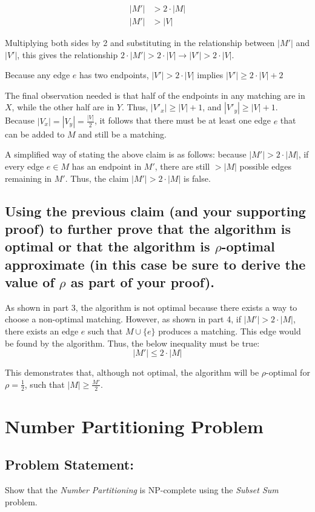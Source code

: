 \documentclass{article}
\begin{document}
\begin{align*}
|M'| &> 2 \cdot |M|  \\
|M'| &> |V|
\end{align*}

\noindent Multiplying both sides by 2 and substituting in the relationship between $|M'|$ and $|V'|$, this gives the relationship $2 \cdot |M'| > 2 \cdot |V| \rightarrow |V'| > 2 \cdot |V|$.

Because any edge $e$ has two endpoints, 
$|V'| > 2 \cdot |V|$ implies $|V'| \geq 2 \cdot |V| + 2 $

The final observation needed is that half of the endpoints in any matching are in $X$, while the other half are in $Y$.  Thus,
$|V'_x| \geq |V| + 1$, and $|V'_y| \geq |V| + 1$.
Because $|V_x| = |V_y| = \frac{|V|}{2}$, it follows that there must be at least one edge $e$ that can be added to $M$ and still be a matching.  

A simplified way of stating the above claim is as follows:  because $|M'| > 2 \cdot |M|$, if every edge $e \in M$ has an endpoint in $M'$, there are still $>|M|$ possible edges remaining in $M'$.  Thus, the claim $|M'| > 2 \cdot |M|$ is false.

\subsection{Using the previous claim (and your supporting proof) to further prove that the algorithm is optimal or that the algorithm is $\rho$-optimal approximate (in this case be sure to derive the value of $\rho$ as part of your proof).}
As shown in part 3, the algorithm is not optimal because there exists a way to choose a non-optimal matching.
However, as shown in part 4, if $|M'| > 2 \cdot |M|$, there exists an edge $e$ such that $M \cup \{e\}$ produces a matching.  This edge would be found by the algorithm.  Thus, the below inequality must be true:
$$ |M'| \leq 2 \cdot |M| $$

\noindent This demonstrates that, although not optimal, the algorithm will be $\rho$-optimal for $\rho = \frac{1}{2}$, such that $|M| \geq \frac{M'}{2}$.

\newpage

\section{Number Partitioning Problem}

\subsection{Problem Statement:}  
Show that the \textit{Number Partitioning} is NP-complete using the \textit{Subset Sum} problem.
\end{document}
